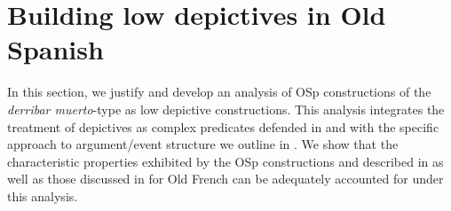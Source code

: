 \documentclass[output=paper,colorlinks,citecolor=brown,
]{langscibook}
\begin{document}




\section{Building low depictives in Old Spanish}\label{sec:acedomatellan:4}

In this section, we justify and develop an analysis of OSp constructions of the \textit{derribar muerto}-type as low depictive constructions. This analysis integrates the treatment of depictives as complex predicates defended in \citet{Geuder2000} and \citet{Pylkkanen2008} with the specific approach to argument/event structure we outline in . We show that the characteristic properties exhibited by the OSp constructions and described in  as well as those discussed in  for Old French can be adequately accounted for under this analysis.
\end{document}
